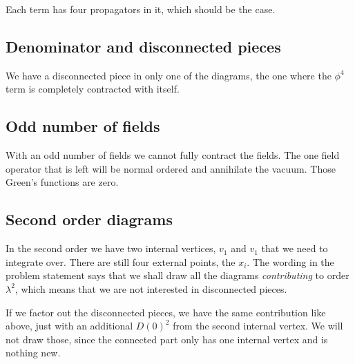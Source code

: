 \documentclass[11pt, english, fleqn, DIV=15, headinclude, BCOR=1cm]{scrartcl}
\begin{document}
Each term has four propagators in it, which should be the case.

\subsection{Denominator and disconnected pieces}

We have a disconnected piece in only one of the diagrams, the one where the
$\phi^4$ term is completely contracted with itself.


\subsection{Odd number of fields}

With an odd number of fields we cannot fully contract the fields. The one field
operator that is left will be normal ordered and annihilate the vacuum. Those
Green's functions are zero.

\subsection{Second order diagrams}

In the second order we have two internal vertices, $v_1$ and $v_1$ that we need
to integrate over. There are still four external points, the $x_i$. The wording
in the problem statement says that we shall draw all the diagrams
\emph{contributing} to order $\lambda^2$, which means that we are not
interested in disconnected pieces.

If we factor out the disconnected pieces, we have the same contribution like
above, just with an additional $D(0)^2$ from the second internal vertex. We
will not draw those, since the connected part only has one internal vertex and
is nothing new.
\end{document}
